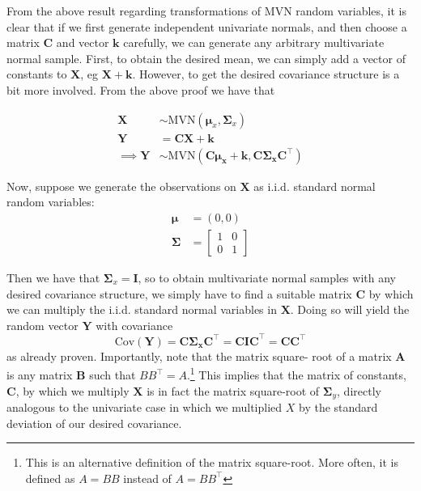 \documentclass[
]{article}
\begin{document}
From the above result regarding transformations of MVN random variables,
it is clear that if we first generate independent univariate normals,
and then choose a matrix \(\boldsymbol{C}\) and vector
\(\boldsymbol{k}\) carefully, we can generate any arbitrary multivariate
normal sample. First, to obtain the desired mean, we can simply add a
vector of constants to \(\boldsymbol{X}\), eg
\(\boldsymbol{X} + \boldsymbol{k}\). However, to get the desired
covariance structure is a bit more involved. From the above proof we
have that

\begin{align}
\boldsymbol{X} &\sim \mathrm{MVN}(\boldsymbol{\mu}_x, \boldsymbol{\Sigma}_x) \nonumber \\[1ex]
\boldsymbol{Y} &= \boldsymbol{CX} + \boldsymbol{k} \nonumber \\[1.5ex]
\implies \boldsymbol{Y} &\sim \mathrm{MVN}(\boldsymbol{C\mu_x} + \boldsymbol{k}, \boldsymbol{ C\Sigma_x C^\top})
\end{align}

Now, suppose we generate the observations on \(\boldsymbol{X}\) as
i.i.d. standard normal random variables: \begin{align}
\boldsymbol{\mu }&= (0,0) \nonumber \\[1.5ex]
\boldsymbol{\Sigma }&= \begin{bmatrix}
1 & 0 \\
0 & 1 
\end{bmatrix} \nonumber 
\end{align}

Then we have that \(\boldsymbol{\Sigma}_x = \boldsymbol{I}\), so to
obtain multivariate normal samples with any desired covariance
structure, we simply have to find a suitable matrix \(\boldsymbol{C}\)
by which we can multiply the i.i.d. standard normal variables in
\(\boldsymbol{X}\). Doing so will yield the random vector
\(\boldsymbol{Y}\) with covariance
\[\mathrm{Cov}(\boldsymbol{Y}) = \boldsymbol{C\Sigma_x C}^\top = \boldsymbol{CIC}^\top = \boldsymbol{CC}^\top\]
as already proven. Importantly, note that the matrix square- root of a
matrix \(\boldsymbol{A}\) is any matrix \(\boldsymbol{B}\) such that
\(BB^\top = A\).\footnote{This is an alternative definition of the
  matrix square-root. More often, it is defined as \(A=BB\) instead of
  \(A=BB^\top\)} This implies that the matrix of constants,
\(\boldsymbol{C}\), by which we multiply \(\boldsymbol{X}\) is in fact
the matrix square-root of \(\boldsymbol{\Sigma}_y\), directly analogous
to the univariate case in which we multiplied \(X\) by the standard
deviation of our desired covariance.
\end{document}
